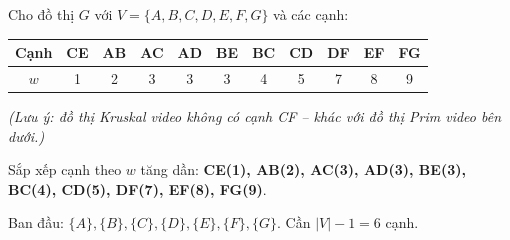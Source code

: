 \documentclass[10pt]{article}
\begin{document}
Cho đồ thị $G$ với $V = \{A, B, C, D, E, F, G\}$ và các cạnh:

\begin{center}
\begin{tabular}{|c|c|c|c|c|c|c|c|c|c|c|}
\hline
Cạnh & CE & AB & AC & AD & BE & BC & CD & DF & EF & FG \\
\hline
$w$ & 1 & 2 & 3 & 3 & 3 & 4 & 5 & 7 & 8 & 9 \\
\hline
\end{tabular}
\end{center}

\textit{(Lưu ý: đồ thị Kruskal video không có cạnh CF -- khác với đồ thị Prim video bên dưới.)}

Sắp xếp cạnh theo $w$ tăng dần: \textbf{CE(1), AB(2), AC(3), AD(3), BE(3), BC(4), CD(5), DF(7), EF(8), FG(9)}.

Ban đầu: $\{A\}, \{B\}, \{C\}, \{D\}, \{E\}, \{F\}, \{G\}$. Cần $|V|-1 = 6$ cạnh.
\end{document}
